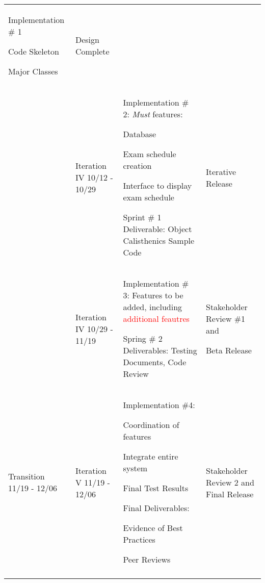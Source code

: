 \documentclass[11pt]{article}
\newenvironment{packed_itemize}{
\begin{itemize}
  \setlength{\itemsep}{1pt}
  \setlength{\parskip}{0pt}
  \setlength{\parsep}{0pt}
}{\end{itemize}}
\begin{document}
\begin{tabular}{|m{0.9in}|m{0.9in}|m{3.2in}|m{.9in}|}
 Implementation \# 1
	\begin{packed_itemize}
		\vspace{-0.15in}
		\item Code Skeleton
		\item Major Classes
	\end{packed_itemize}
 & Design Complete \\  \cline{2-4}
&
 Iteration IV 10/12 - 10/29 &
 Implementation \# 2: 
\emph{Must} features:
	\begin{packed_itemize}
		\item Database 
		\item Exam schedule creation
		\item Interface to display exam schedule
		\item 
	\end{packed_itemize}

 
Sprint \# 1 Deliverable: Object Calisthenics Sample Code
 & Iterative Release \\  \cline{2-4}
 &
 Iteration IV 10/29 - 11/19 &
 Implementation \# 3: Features to be added, including \textcolor{red}{additional feautres}

Spring \# 2 Deliverables: Testing Documents, Code Review &
 Stakeholder Review \#1 
and

Beta Release \\ \hline
Transition  11/19 - 12/06 &
Iteration V 11/19 - 12/06 &
Implementation \#4: 
	\begin{packed_itemize}
		\vspace{-0.15in}
		\item Coordination of features
		\item Integrate entire system
	\end{packed_itemize}
Final Test Results

Final Deliverables:
	\begin{packed_itemize}
	\vspace{-0.15in}
		\item Evidence of Best Practices
		\item Peer Reviews
	\end{packed_itemize}
	\vspace{-0.4in}
& 
Stakeholder Review 2 and Final Release
\\
&&& \\
\hline
\end{tabular}



\end{document}
